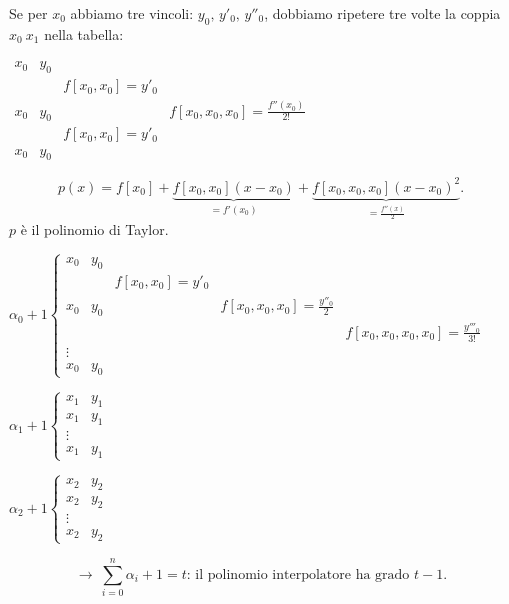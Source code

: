 \begin{exe}
Se per $x_0$ abbiamo tre vincoli: $y_0, \, y'_0, \, y''_0$, dobbiamo ripetere
tre volte la coppia $x_0 \ x_1$ nella tabella:

$\begin{array}{llllll}
x_0 & y_0   &   \\
    &     & f[x_0,x_0]= y'_0 \\
x_0 & y_0  &            & f[x_0,x_0,x_0]  = \frac{f''(x_0)}{2!}\\
    &     & f[x_0,x_0]= y'_0 &           \\
x_0 & y_0 &            
\end{array}$

\[p(x) = f[x_0] + \underbrace{f[x_0,x_0](x-x_0)}_{= f'(x_0)} + 
\underbrace{f[x_0,x_0,x_0](x-x_0)^2}_{= \frac{f''(x)}{2}}.\]
$p$ è il polinomio di Taylor.
\end{exe}

\begin{flushleft}
$\alpha_0 + 1 \left\{
\begin{array}{lllll}
x_0 & y_0  \\
    &     & f[x_0,x_0] = y'_0 \\
x_0 & y_0 &  & f[x_0,x_0,x_0] = \frac{y''_0}{2} \\
    &     &  &         & f[x_0,x_0,x_0,x_0] = \frac{y'''_0}{3!}\\
\vdots \\
x_0 & y_0
\end{array}
\right.$
\end{flushleft}
\begin{flushleft}
$\alpha_1 + 1 \left\{
\begin{array}{ll}
x_1 & y_1  \\
x_1 & y_1 \\
   
\vdots \\
x_1 & y_1
\end{array}
\right.$
\end{flushleft}
\begin{flushleft}
$\alpha_2 + 1 \left\{
\begin{array}{ll}
x_2 & y_2  \\
x_2 & y_2 \\
   
\vdots \\
x_2 & y_2
\end{array}
\right.$
\end{flushleft}

\[\longrightarrow \ \sum_{i=0}^n\alpha_i + 1 = t \textrm{: il polinomio
interpolatore ha grado } t-1.\]

